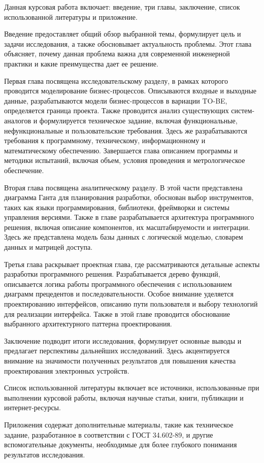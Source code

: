 Данная курсовая работа включает: введение, три главы, заключение,
список использованной литературы и приложение.

Введение предоставляет общий обзор выбранной темы, формулирует цель
и задачи исследования, а также обосновывает актуальность проблемы.
Этот глава объясняет,
почему данная проблема важна для современной инженерной практики
и какие преимущества дает ее решение.

Первая глава посвящена исследовательскому разделу,
в рамках которого проводится моделирование бизнес-процессов.
Описываются входные и выходные данные,
разрабатываются модели бизнес-процессов в вариации TO-BE,
определяется граница проекта.
Также проводится анализ существующих систем-аналогов
и формулируется техническое задание, включая функциональные, нефункциональные
и пользовательские требования.
Здесь же разрабатываются требования к программному, техническому,
информационному и математическому обеспечению.
Завершается глава описанием программы и методики испытаний,
включая объем, условия проведения и метрологическое обеспечение.

Вторая глава посвящена аналитическому разделу.
В этой части представлена диаграмма Ганта для планирования разработки,
обоснован выбор инструментов, таких как языки программирования,
библиотеки, фреймворки и системы управления версиями.
Также в главе разрабатывается архитектура программного решения,
включая описание компонентов, их масштабируемости и интеграции.
Здесь же представлена модель базы данных с логической моделью,
словарем данных и матрицей доступа.

Третья глава раскрывает проектная глава,
где рассматриваются детальные аспекты разработки программного решения.
Разрабатывается дерево функций,
описывается логика работы программного обеспечения
с использованием диаграмм прецедентов и последовательности.
Особое внимание уделяется проектированию интерфейсов,
описанию пути пользователя и выбору технологий для реализации интерфейса.
Также в этой главе проводится обоснование выбранного
архитектурного паттерна проектирования.

Заключение подводит итоги исследования,
формулирует основные выводы и предлагает перспективы дальнейших исследований.
Здесь акцентируется внимание на значимости полученных результатов
для повышения качества проектирования электронных устройств.

Список использованной литературы включает все источники,
использованные при выполнении курсовой работы, включая научные статьи,
книги, публикации и интернет-ресурсы.

Приложения содержат дополнительные материалы, такие как техническое задание,
разработанное в соответствии с ГОСТ 34.602-89,
и другие вспомогательные документы,
необходимые для более глубокого понимания результатов исследования.

